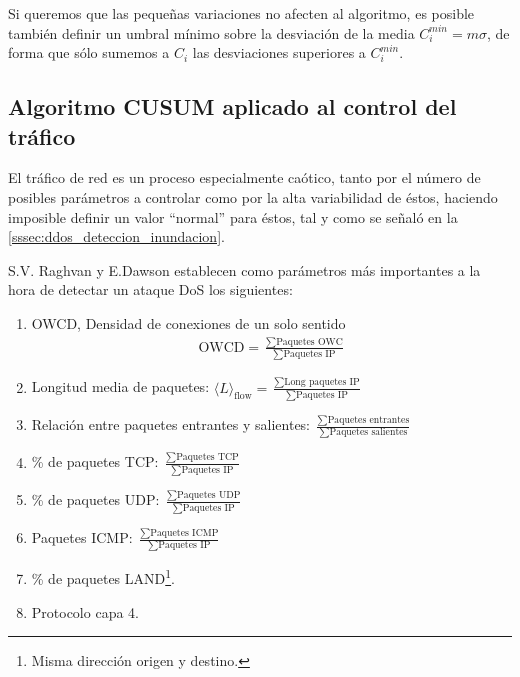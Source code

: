 Si queremos que las pequeñas variaciones no afecten al algoritmo, es posible también
definir un umbral mínimo sobre la desviación de la media $C_i^{min}=m\sigma$, de 
forma que sólo sumemos a $C_i$ las desviaciones superiores a $C_i^{min}$.

\subsection{Algoritmo CUSUM aplicado al control del tráfico}
\label{ssec:cusum_aplicado_trafico}
El tráfico de red es un proceso especialmente caótico, tanto por el número de posibles
parámetros a controlar como por la alta variabilidad de éstos,
haciendo imposible definir un valor ``normal'' para éstos, tal y como se señaló en la 
\autoref{sssec:ddos_deteccion_inundacion}.

S.V. Raghvan y E.Dawson establecen como parámetros más importantes a la hora de detectar un ataque 
\gls{DoS} los siguientes:


\begin{enumerate}
 \item \gls{OWCD}, Densidad de conexiones de un solo sentido
 \begin{align*}
  \text{OWCD} = \frac{\sum\text{Paquetes OWC}}{\sum\text{Paquetes IP}}
 \end{align*}

 \item Longitud media de paquetes: 
   $\langle L\rangle_{\text{flow}} = \frac{\sum\text{Long paquetes IP}}{\sum\text{Paquetes IP}}$
 
 \item Relación entre paquetes entrantes y salientes: 
   $\frac{\sum\text{Paquetes entrantes}}{\sum\text{Paquetes salientes}}$
 
 \item \% de paquetes TCP: $\frac{\sum\text{Paquetes TCP}}{\sum\text{Paquetes IP}}$ 
 \item \% de paquetes UDP: $\frac{\sum\text{Paquetes UDP}}{\sum\text{Paquetes IP}}$
 \item Paquetes ICMP: $\frac{\sum\text{Paquetes ICMP}}{\sum\text{Paquetes IP}}$
 \item \% de paquetes LAND\footnote{Misma dirección origen y destino.}.
 \item Protocolo capa 4.
\end{enumerate}

